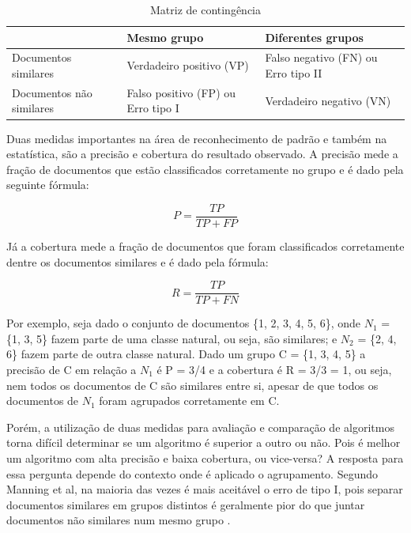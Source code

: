 \documentclass[a4paper,12pt]{article}
\begin{document}
\begin{table}[h]
\centering
\begin{tabular}{ | p{3cm} | p{4cm} | p{4cm} | }
\hline
& Mesmo grupo & Diferentes grupos                                                                   \\ \hline
Documentos similares	& Verdadeiro positivo (VP) & Falso negativo (FN) ou Erro tipo II \\ \hline
Documentos não similares	&  Falso positivo (FP) ou Erro tipo I & Verdadeiro negativo (VN) \\
\hline
\end{tabular}
\caption{Matriz de contingência}
\label{table:matrix_contingencia}
\end{table}

Duas medidas importantes na área de reconhecimento de padrão e também na estatística, são a precisão e cobertura do resultado observado. A precisão mede a fração de documentos que estão classificados corretamente no grupo e é dado pela seguinte fórmula:

\begin{equation} P = \frac{TP} {TP + FP} \end{equation}

Já a cobertura mede a fração de documentos que foram classificados corretamente dentre os documentos similares e é dado pela fórmula:

\begin{equation} R = \frac{TP} {TP + FN} \end{equation}

Por exemplo, seja dado o conjunto de documentos \{1, 2, 3, 4, 5, 6\}, onde $N_{1}$ = \{1, 3, 5\} fazem parte de uma classe natural, ou seja, são similares; e $N_{2}$ = \{2, 4, 6\} fazem parte de outra classe natural. Dado um grupo C = \{1, 3, 4, 5\} a precisão de C em relação a $N_{1}$ é P = 3/4 e a cobertura é R = 3/3 = 1, ou seja, nem todos os documentos de C são similares entre si, apesar de que todos os documentos de $N_{1}$ foram agrupados corretamente em C.

Porém, a utilização de duas medidas para avaliação e comparação de algoritmos torna difícil determinar se um algoritmo é superior a outro ou não. Pois é melhor um algoritmo com alta precisão e baixa cobertura, ou vice-versa? A resposta para essa pergunta depende do contexto onde é aplicado o agrupamento. Segundo Manning et al, na maioria das vezes é mais aceitável o erro de tipo I, pois separar documentos similares em grupos distintos é geralmente pior do que juntar documentos não similares num mesmo grupo \cite{Ester03}.
\end{document}
